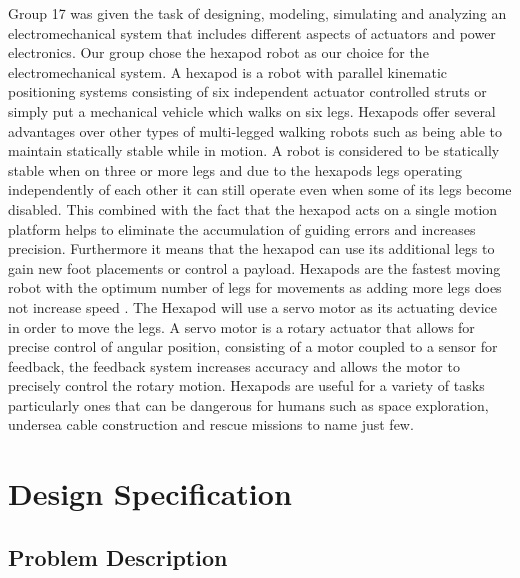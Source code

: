 Group 17 was given the task of designing, modeling, simulating and analyzing an electromechanical system that includes different aspects of actuators and power electronics. Our group chose the hexapod robot as our choice for the electromechanical system. A hexapod is a robot with parallel kinematic positioning systems consisting of six independent actuator controlled struts or simply put a mechanical vehicle which walks on six legs. Hexapods offer several advantages over other types of multi-legged  walking robots such as being able to maintain statically stable while in motion. A robot is considered to be statically stable when on three or more legs and due to the hexapods legs operating independently of each other it can still operate even when some of its legs become disabled. This combined with the fact that the hexapod acts on a single motion platform helps to eliminate the accumulation of guiding errors and increases precision. Furthermore it means that  the hexapod can use its additional legs to gain new foot placements or control a payload. Hexapods are the fastest moving robot with the optimum number of legs for movements as adding more legs does not increase speed \cite{urrea2016design}. The Hexapod will use a servo motor as its actuating device in order to move the legs. A servo motor is a rotary actuator that allows for precise control of angular position, consisting of a motor coupled to a sensor for feedback, the feedback system increases accuracy and allows the motor to precisely control the rotary motion. Hexapods are useful for a variety of tasks particularly ones that can be dangerous for humans such as space exploration, undersea cable construction and rescue missions to name just few. 









\section{Design Specification}




\subsection{Problem Description}

